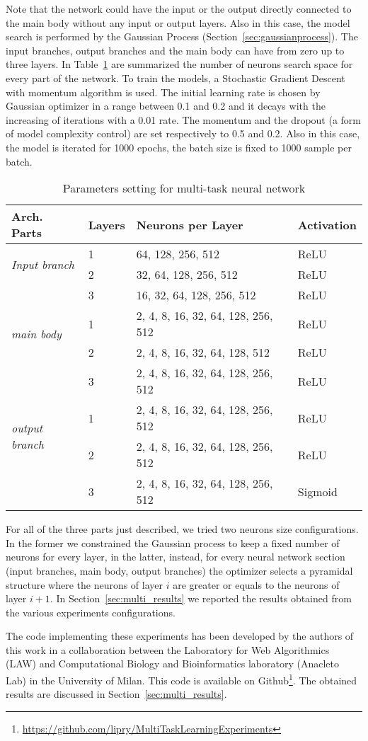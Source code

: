 Note that the network could have the input or the output directly connected to the main body without any input or output layers. 
Also in this case, the model search is performed by the Gaussian Process
(Section~\ref{sec:gaussianprocess}). The input branches, output branches and
the main body can have from zero up to three layers. In Table~\ref{tab:mplmtl} are summarized the number of neurons search space for every part of the network. 
To train the models, a Stochastic Gradient Descent with momentum algorithm is used. The initial learning rate is chosen by Gaussian optimizer in a range between 0.1 and 0.2 and it decays with the increasing of iterations with a 0.01 rate. The momentum and the dropout (a form of model complexity control) are set respectively to 0.5 and 0.2. Also in this case, the model is iterated for 1000 epochs, the batch size is fixed to 1000 sample per batch. 
\begin{table}[t]
\centering
\begin{tabular}{llll}
\toprule
\textbf{Arch. Parts} & \textbf{Layers} & \textbf{Neurons per Layer} & \textbf{Activation} \\ 
\midrule
\multirow{2}{*}{\textit{Input branch}}  & 1 & 64, 128, 256, 512 & ReLU \\ 
{} & 2 & 32, 64, 128, 256, 512 & ReLU \\
{} & 3 & 16, 32, 64, 128, 256, 512 & ReLU \\
\midrule
\multirow{2}{*}{\textit{main body}} & 1 & 2, 4, 8, 16, 32, 64, 128, 256, 512 & ReLU \\ 
{} & 2 & 2, 4, 8, 16, 32, 64, 128, 512 & ReLU \\
{} & 3 & 2, 4, 8, 16, 32, 64, 128, 256, 512 & ReLU \\
\midrule
\multirow{2}{*}{\textit{output branch}} & 1 & 2, 4, 8, 16, 32, 64, 128, 256, 512 & ReLU\\ 
{} & 2 & 2, 4, 8, 16, 32, 64, 128, 256, 512 & ReLU \\
{} & 3 & 2, 4, 8, 16, 32, 64, 128, 256, 512 & Sigmoid \\
\bottomrule
\end{tabular}
\caption{Parameters setting for multi-task neural network}
\label{tab:mplmtl}
\end{table}
For all of the three parts just described, we tried two neurons size configurations. In the former we constrained the Gaussian process to keep a fixed number of neurons for every layer, in the latter, instead, for every neural network section (input branches, main body, output branches) the optimizer selects a pyramidal structure where the neurons of layer $i$ are greater or equals to the neurons of layer $i+1$.
In Section~\ref{sec:multi_results} we reported the results obtained from the various experiments configurations. 

The code implementing these experiments has been developed by the authors of this work in a collaboration between the Laboratory for Web Algorithmics (LAW) and Computational Biology and Bioinformatics laboratory (Anacleto Lab) in the University of Milan. This code is available on Github\footnote{\url{https://github.com/lipry/MultiTaskLearningExperiments}}. The obtained results are discussed in Section~\ref{sec:multi_results}.

